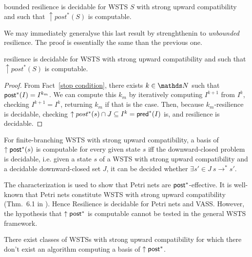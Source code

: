 \begin{theorem}\cite{DBLP:conf/gg/Ozkan22,DBLP:journals/corr/abs-2108-00889}
{\sc bounded resilience} is decidable for WSTS $S$ with strong upward compatibility and such that $\uparrow post^*(S)$ is computable.
\end{theorem}

We may immediately generalyse this last result by strenghthenin to \emph{unbounded} resilience. The proof is essentially the same than the previous one.

\begin{corollary}\label{postcomputable}
{\sc resilience} is decidable for WSTS with strong upward compatibility and such that $\uparrow post^*(S)$ is computable.
\end{corollary}


\begin{proof}
From Fact~\ref{stop condition}, there exists $k \in \N$ such that
$\textsf{post}^*(I) = I^{k_m}$. We can compute this $k_m$ by iteratively computing
$I^{k+1}$ from $I^k$, checking $I^{k+1}=I^k$, 
returning $k_m$ if that is the case.
Then, because $k_m$-resilience is decidable, 
checking $\uparrow post^*(s) \cap J \subseteq I^k = \textsf{pred}^*(I)$ is,
and resilience is decidable.
\end{proof}

\begin{proposition}
For finite-branching WSTS with strong upward compatibility, a basis of $\uparrow \textsf{post}^*(s)$ is computable for every given state $s$ iff the downward-closed problem is decidable, i.e. given a state $s$ of a WSTS
with strong upward compatibility 
and a decidable downward-closed set $J$, it can be decided whether $\exists s' \in J ~ s \to^* s'$. 
\end{proposition}

The characterization is used to show that Petri nets are $\textsf{post}^*$-effective. It is well-known that Petri nets constitute WSTS with strong upward compatibility (Thm.~6.1 in \cite{DBLP:journals/tcs/FinkelS01}). Hence Resilience is decidable for Petri nets and VASS.
However, the hypothesis that $\uparrow \textsf{post}^*$ is computable cannot be tested in the general WSTS framework.

\begin{proposition}
There exist classes of WSTSs with strong upward compatibility for which there don't exist an algorithm computing a basis of $\uparrow \textsf{post}^*$.
\end{proposition}


